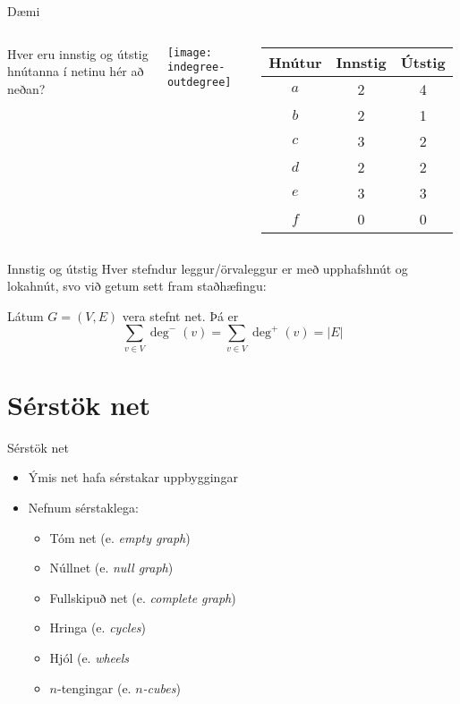 \documentclass[handout]{beamer}
\begin{document}
\begin{frame}{Dæmi}
\begin{columns}
Hver eru innstig og útstig hnútanna í netinu hér að neðan?

\vspace{0.5cm}
\texttt{[image: indegree-outdegree]}
\pause
{}
\begin{tabular}{ccc}
\toprule
Hnútur&Innstig&Útstig\\
\midrule
$a$&2&4\\
$b$&2&1\\
$c$&3&2\\
$d$&2&2\\
$e$&3&3\\
$f$&0&0\\
\bottomrule
\end{tabular}
\end{columns}
\end{frame}

\begin{frame}{Innstig og útstig}
Hver stefndur leggur/örvaleggur er með upphafshnút og lokahnút, svo við getum sett fram staðhæfingu:

\begin{tcolorbox}
Látum $G = (V,E)$ vera stefnt net. Þá er
\[
\sum_{v\in V} \deg^-(v) = \sum_{v\in V} \deg^+(v) = |E|
\]
\end{tcolorbox}

\end{frame}

\section{Sérstök net}

\begin{frame}{Sérstök net}
\begin{itemize}
 \item Ýmis net hafa sérstakar uppbyggingar
 \item Nefnum sérstaklega:
 \begin{itemize}
  \item Tóm net (e. \emph{empty graph})
  \item Núllnet (e. \emph{null graph})
  \item Fullskipuð net (e. \emph{complete graph})
  \item Hringa (e. \emph{cycles})
  \item Hjól (e. \emph{wheels}
  \item $n$-tengingar (e. \emph{$n$-cubes})
 \end{itemize}
\end{itemize}
\end{frame}
\end{document}
